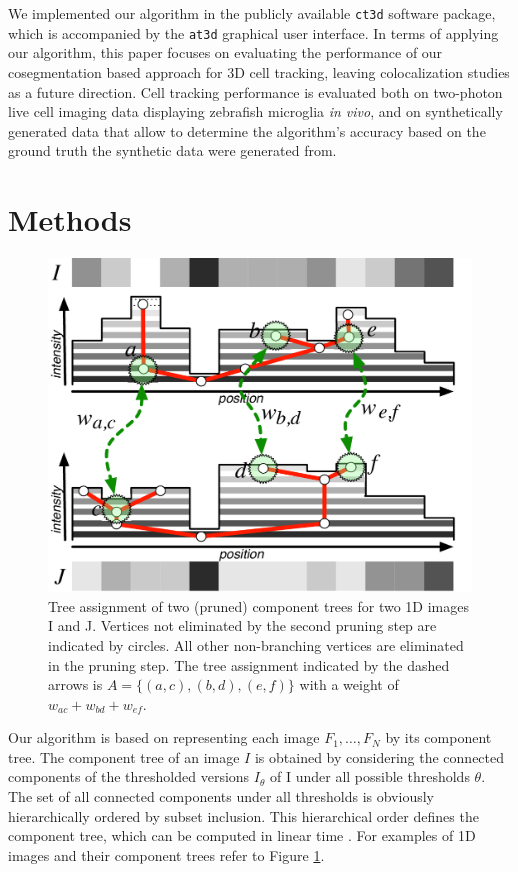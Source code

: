 We implemented our algorithm in the publicly available \texttt{ct3d}
software package, which is accompanied by the \texttt{at3d} graphical
user interface. In terms of applying our algorithm, this paper focuses
on evaluating the performance of our cosegmentation based approach for
3D cell tracking, leaving colocalization studies as a future
direction. Cell tracking performance is evaluated both on two-photon
live cell imaging data displaying zebrafish microglia \textit{in
  vivo}, and on synthetically generated data that allow to determine
the algorithm's accuracy based on the ground truth the synthetic data
were generated from.

\section{Methods}

\begin{figure}[htbp]
\centering
\includegraphics[width=.5\textwidth]{images/coseg_fig2}
\caption[Tree assignment of two (pruned) component trees for two 1D images I and J]{Tree assignment of two (pruned) component trees for two 1D images I and J. Vertices not eliminated by the second pruning step are indicated by circles. All other non-branching vertices are eliminated in the pruning step. The tree assignment indicated by the dashed arrows is $A = \{(a, c), (b, d), (e, f)\}$ with a weight of $w_{ac}+w_{bd}+w_{ef}$.}
\label{fig:coseg-fig2}
\end{figure}

Our algorithm is based on representing each image $F_1,\ldots,F_N$ by its component tree\cite{jones1999connected}. The component tree of an image $I$ is obtained by considering the connected components of the thresholded versions $I_θ$ of I under all possible thresholds $θ$. The set of all connected components under all thresholds is obviously hierarchically ordered by subset inclusion. This hierarchical order defines the component tree, which can be computed in linear time \cite{Najman:04}. For examples of 1D images and their component trees refer to Figure \ref{fig:coseg-fig2}. 

